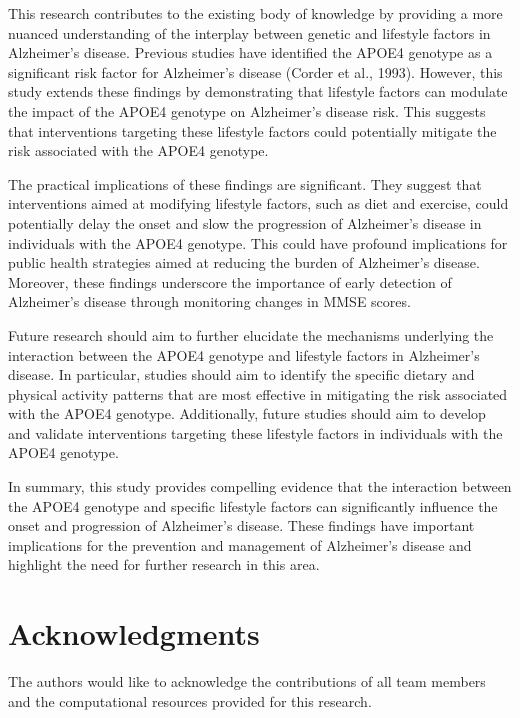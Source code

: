 \documentclass[conference]{IEEEtran}
\begin{document}
This research contributes to the existing body of knowledge by providing a more nuanced understanding of the interplay between genetic and lifestyle factors in Alzheimer's disease. Previous studies have identified the APOE4 genotype as a significant risk factor for Alzheimer's disease (Corder et al., 1993). However, this study extends these findings by demonstrating that lifestyle factors can modulate the impact of the APOE4 genotype on Alzheimer's disease risk. This suggests that interventions targeting these lifestyle factors could potentially mitigate the risk associated with the APOE4 genotype.

The practical implications of these findings are significant. They suggest that interventions aimed at modifying lifestyle factors, such as diet and exercise, could potentially delay the onset and slow the progression of Alzheimer's disease in individuals with the APOE4 genotype. This could have profound implications for public health strategies aimed at reducing the burden of Alzheimer's disease. Moreover, these findings underscore the importance of early detection of Alzheimer's disease through monitoring changes in MMSE scores.

Future research should aim to further elucidate the mechanisms underlying the interaction between the APOE4 genotype and lifestyle factors in Alzheimer's disease. In particular, studies should aim to identify the specific dietary and physical activity patterns that are most effective in mitigating the risk associated with the APOE4 genotype. Additionally, future studies should aim to develop and validate interventions targeting these lifestyle factors in individuals with the APOE4 genotype.

In summary, this study provides compelling evidence that the interaction between the APOE4 genotype and specific lifestyle factors can significantly influence the onset and progression of Alzheimer's disease. These findings have important implications for the prevention and management of Alzheimer's disease and highlight the need for further research in this area.

\section{Acknowledgments}
The authors would like to acknowledge the contributions of all team members and the computational resources provided for this research.
\end{document}
